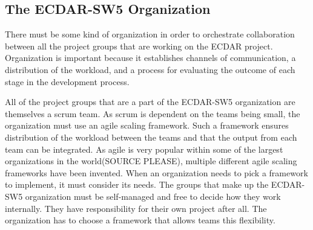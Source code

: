 \subsection{The ECDAR-SW5 Organization}\label{sub:ecdar-organization}
There must be some kind of organization in order to orchestrate collaboration between all the project groups that are working on the ECDAR project. 
Organization is important because it establishes channels of communication, a distribution of the workload, and a process for evaluating the outcome of each stage in the development process.

All of the project groups that are a part of the ECDAR-SW5 organization are themselves a scrum team. 
As scrum is dependent on the teams being small, the organization must use an agile scaling framework. 
Such a framework ensures distribution of the workload between the teams and that the output from each team can be integrated. 
As agile is very popular within some of the largest organizations in the world(SOURCE PLEASE), multiple different agile scaling frameworks have been invented. 
When an organization needs to pick a framework to implement, it must consider its needs. 
The groups that make up the ECDAR-SW5 organization must be self-managed and free to decide how they work internally. They have responsibility for their own project after all. The organization has to choose a framework that allows teams this flexibility.